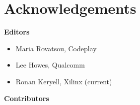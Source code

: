 %

\chapter{Acknowledgements}

\noindent\textbf{Editors}

\begin{itemize}
\item Maria Rovatsou, Codeplay
\item Lee Howes, Qualcomm
\item Ronan Keryell, Xilinx (current)
\end{itemize}


\noindent\textbf{Contributors}

